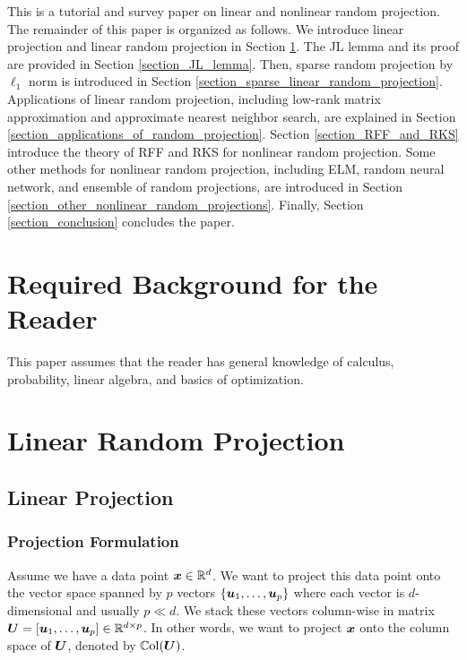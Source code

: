 \documentclass{article}
\def\b{\ensuremath\boldsymbol}
\begin{document}
This is a tutorial and survey paper on linear and nonlinear random projection.
The remainder of this paper is organized as follows. We introduce linear projection and linear random projection in Section \ref{section_linear_random_projection}. The JL lemma and its proof are provided in Section \ref{section_JL_lemma}. Then, sparse random projection by $\ell_1$ norm is introduced in Section \ref{section_sparse_linear_random_projection}. Applications of linear random projection, including low-rank matrix approximation and approximate nearest neighbor search, are explained in Section \ref{section_applications_of_random_projection}. Section \ref{section_RFF_and_RKS} introduce the theory of RFF and RKS for nonlinear random projection. Some other methods for nonlinear random projection, including ELM, random neural network, and ensemble of random projections, are introduced in Section \ref{section_other_nonlinear_random_projections}. Finally, Section \ref{section_conclusion} concludes the paper. 

\section*{Required Background for the Reader}

This paper assumes that the reader has general knowledge of calculus, probability, linear algebra, and basics of optimization. 

\section{Linear Random Projection}\label{section_linear_random_projection}

\subsection{Linear Projection}

\subsubsection{Projection Formulation}

Assume we have a data point $\b{x} \in \mathbb{R}^d$. We want to project this data point onto the vector space spanned by $p$ vectors $\{\b{u}_1, \dots, \b{u}_p\}$ where each vector is $d$-dimensional and usually $p \ll d$. We stack these vectors column-wise in matrix $\b{U} = [\b{u}_1, \dots, \b{u}_p] \in \mathbb{R}^{d \times p}$. In other words, we want to project $\b{x}$ onto the column space of $\b{U}$, denoted by $\mathbb{C}\text{ol}(\b{U})$.
\end{document}
